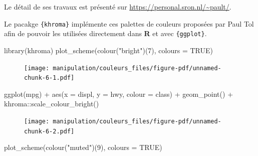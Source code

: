 \documentclass[
  letterpaper,
  DIV=11,
  numbers=noendperiod,
  oneside]{scrreprt}
\newenvironment{Shaded}{\begin{snugshade}}{\end{snugshade}}
\newcommand{\AttributeTok}[1]{\textcolor[rgb]{0.40,0.45,0.13}{#1}}
\newcommand{\ConstantTok}[1]{\textcolor[rgb]{0.56,0.35,0.01}{#1}}
\newcommand{\DecValTok}[1]{\textcolor[rgb]{0.68,0.00,0.00}{#1}}
\newcommand{\FunctionTok}[1]{\textcolor[rgb]{0.28,0.35,0.67}{#1}}
\newcommand{\NormalTok}[1]{\textcolor[rgb]{0.00,0.23,0.31}{#1}}
\newcommand{\SpecialCharTok}[1]{\textcolor[rgb]{0.37,0.37,0.37}{#1}}
\newcommand{\StringTok}[1]{\textcolor[rgb]{0.13,0.47,0.30}{#1}}
\begin{document}
Le détail de ses travaux est présenté sur
\url{https://personal.sron.nl/~pault/}.

Le pacakge \texttt{\{khroma\}} implémente ces palettes de couleurs
proposées par Paul Tol afin de pouvoir les utilisées directement dans
\textbf{R} et avec \texttt{\{ggplot\}}.

\begin{Shaded}
\begin{Highlighting}[]
\FunctionTok{library}\NormalTok{(khroma)}
\FunctionTok{plot\_scheme}\NormalTok{(}\FunctionTok{colour}\NormalTok{(}\StringTok{"bright"}\NormalTok{)(}\DecValTok{7}\NormalTok{), }\AttributeTok{colours =} \ConstantTok{TRUE}\NormalTok{)}
\end{Highlighting}
\end{Shaded}

\begin{figure}[H]

{\centering \texttt{[image: manipulation/couleurs\_files/figure-pdf/unnamed-chunk-6-1.pdf]}

}

\end{figure}

\begin{Shaded}
\begin{Highlighting}[]
\FunctionTok{ggplot}\NormalTok{(mpg) }\SpecialCharTok{+}
  \FunctionTok{aes}\NormalTok{(}\AttributeTok{x =}\NormalTok{ displ, }\AttributeTok{y =}\NormalTok{ hwy, }\AttributeTok{colour =}\NormalTok{ class) }\SpecialCharTok{+}
  \FunctionTok{geom\_point}\NormalTok{() }\SpecialCharTok{+}
\NormalTok{  khroma}\SpecialCharTok{::}\FunctionTok{scale\_colour\_bright}\NormalTok{()}
\end{Highlighting}
\end{Shaded}

\begin{figure}[H]

{\centering \texttt{[image: manipulation/couleurs\_files/figure-pdf/unnamed-chunk-6-2.pdf]}

}

\end{figure}

\begin{Shaded}
\begin{Highlighting}[]
\FunctionTok{plot\_scheme}\NormalTok{(}\FunctionTok{colour}\NormalTok{(}\StringTok{"muted"}\NormalTok{)(}\DecValTok{9}\NormalTok{), }\AttributeTok{colours =} \ConstantTok{TRUE}\NormalTok{)}
\end{Highlighting}
\end{Shaded}
\end{document}

